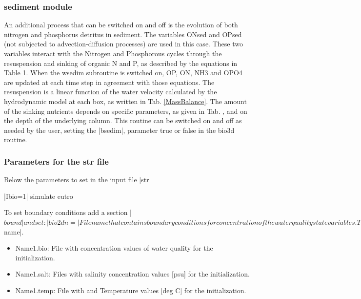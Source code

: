 \subsubsection{sediment module}
An additional process that can be switched on and off is the evolution of both nitrogen and phosphorus detritus in sediment. The variables  ONsed and OPsed (not subjected to advection-diffusion processes) are used in this case. These two variables interact with the Nitrogen and Phosphorous cycles through the resuspension and sinking of organic N and P, as described by the equations in Table 1. When the wsedim  subroutine is switched on, OP, ON, NH3 and OPO4 are updated at each time step in agreement with those equations. The resuspension is a linear function of the water velocity calculated by the hydrodynamic model at each box, as written in Tab. \ref{MassBalance}. The amount of the sinking nutrients depends on specific parameters, as given in Tab. \Ttwoa, and on the depth of the underlying column.
This routine can be switched on and off as needed by the user, setting the |bsedim|, parameter true or false in the bio3d routine. 

\subsubsection{Parameters for the str file}
Below the parameters to set in the input file |str|


|Ibio=1|		simulate eutro

To set boundary conditions add a section |$bound| and set:

|bio2dn=| File name that contains boundary conditions for concentration of the water quality state variables. The format is the same as for the file boundn. The unit of the values given in the second and following column (9 data columns for EUTRO) must the ones of the variable.

Initialization of variables are done using external files, otherwise are set by default in the code, with uniform value in the domain.  Spatially variable initial conditions should be provided in section |$name|.
\begin{itemize}
\item Name1.bio: File with concentration values of water quality for the initialization.
\item Name1.salt: Files with salinity concentration values [psu] for the initialization.
\item Name1.temp: File with and Temperature values [deg C] for the initialization.
\end{itemize}

